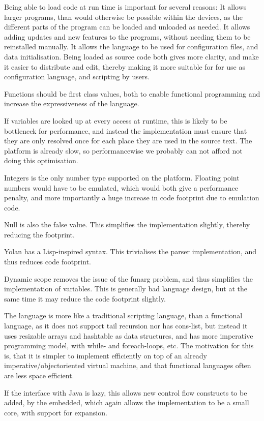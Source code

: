 \documentclass[11pt]{report}
\begin{document}
Being able to load code at run time is important for several reasons:
It allows larger programs, than would otherwise be possible within the devices, as the different parts of the program can be loaded and unloaded as needed.
It allows adding updates and new features to the programs, without needing them to be reinstalled manually.
It allows the language to be used for configuration files, and data initialisation.
Being loaded as source code both gives more clarity, and make it easier to distribute and edit, thereby making it more suitable for for use as configuration language, and scripting by users.

Functions should be first class values, both to enable functional programming and increase the expressiveness of the language.

If variables are looked up at every access at runtime, this is likely to be bottleneck for performance, and instead the implementation must ensure that they are only resolved once for each place they are used in the source text.
The platform is already slow, so performancewise we probably can not afford not doing this optimisation.

Integers is the only number type supported on the platform. Floating point numbers would have to be emulated, which would both give a performance penalty, and more importantly a huge increase in code footprint due to emulation code.

Null is also the false value. This simplifies the implementation slightly, thereby reducing the footprint.

Yolan has a Lisp-inspired syntax. This trivialises the parser implementation, and thus reduces code footprint.

Dynamic scope removes the issue of the funarg problem, and thus simplifies the implementation of variables. This is generally bad language design, but at the same time it may reduce the code footprint slightly.

The language is more like a traditional scripting language, than a functional language, 
as it does not support tail recursion nor has cons-list, but instead it uses resizable arrays and hashtable as data structures, and has more imperative programming model, with while- and foreach-loops, etc.
The motivation for this is, that it is simpler to implement efficiently on top of an already imperative/objectoriented virtual machine, and that functional languages often are less space efficient.

If the interface with Java is lazy, this allows new control flow constructs to be added, by the embedded, which again allows the implementation to be a small core, with support for expansion.
\end{document}
